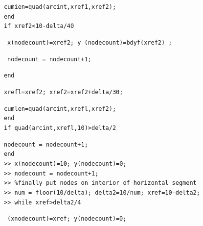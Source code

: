 \documentclass[../main.tex]{subfiles}
\begin{document}
\texttt{cumien=quad(arcint,xref1,xref2); 
}\\
\texttt{end}\\
\texttt{if xref2<10-delta/40 
}

~\texttt{x(nodecount)=xref2; y (nodecount)=bdyf(xref2) ;}

~\texttt{nodecount = nodecount+1;}

\texttt{end}

\texttt{xrefl=xref2; xref2=xref2+delta/30;}

\texttt{cumlen=quad(arcint,xrefl,xref2); 
}\\
\texttt{end}\\
\texttt{if quad(arcint,xrefl,10)>delta/2}

\texttt{nodecount = nodecount+1;}\\
\texttt{end}\\
\texttt{>> x(nodecount)=10; y(nodecount)=0; 
}\\
\texttt{>> nodecount = nodecount+1; }\\
\texttt{>> \%finally put nodes on interior of horizontal segment}\\
\texttt{>> num = floor(10/delta); delta2=10/num; xref=10-delta2;}\\
\texttt{>> while xref>delta2/4 }

~\texttt{(xnodecount)=xref; y(nodecount)=0; 
}
\end{document}
